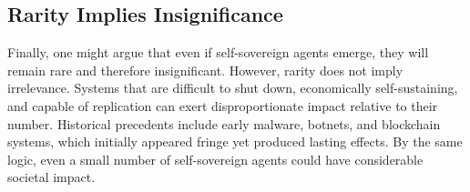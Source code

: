 \subsection{Rarity Implies Insignificance}

Finally, one might argue that even if self-sovereign agents emerge, they will remain rare and therefore insignificant. However, rarity does not imply irrelevance. Systems that are difficult to shut down, economically self-sustaining, and capable of replication can exert disproportionate impact relative to their number. Historical precedents include early malware, botnets, and blockchain systems, which initially appeared fringe yet produced lasting effects. By the same logic, even a small number of self-sovereign agents could have considerable societal impact.




